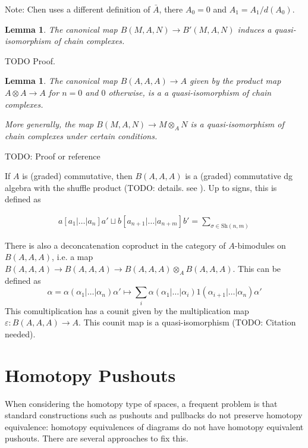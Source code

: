\documentclass{scrartcl}
\theoremstyle{plain}
\newtheorem{lemma}[theorem]{Lemma}
\theoremstyle{definition}
\newcommand{\shuffle}{\mathbin{\sqcup}}
\begin{document}
Note: Chen uses a different definition of $\bar A$, there $A_0 = 0$ and $A_1 = A_1 / d(A_0)$.

\begin{lemma}
    The canonical map $B(M, A, N)\to B'(M, A, N)$ induces a quasi-isomorphism of chain complexes.
\end{lemma}
TODO Proof.

\begin{lemma}\label{thm:bar_resolution}
    The canonical map $B(A, A, A)\to A$ given by the product map $A\otimes A\to A$ for $n=0$ and $0$ otherwise, is a a quasi-isomorphism of chain complexes.

    More generally, the map $B(M,A,N)\to M\otimes_A N$ is a quasi-isomorphism of chain complexes under certain conditions.
\end{lemma}
TODO: Proof or reference

If $A$ is (graded) commutative, then $B(A, A, A)$ is a (graded) commutative dg algebra with the shuffle product (TODO: details. see \cite[4.1]{chen1973iterated}). Up to signs, this is defined as

\begin{align*}
    a[a_1|\dots|a_n]a' \shuffle b[a_{n+1}|\dots|a_{n+m}]b' = \sum_{\sigma\in\mathrm{Sh}(n, m)}
\end{align*}

There is also a deconcatenation coproduct in the category of $A$-bimodules on $B(A, A, A)$, i.e. a map $B(A, A, A)\to B(A, A, A)\to B(A, A, A)\otimes_A B(A, A, A)$. This can be defined as 
$$\alpha = \alpha(\alpha_1|\dots|\alpha_n)\alpha' \mapsto \sum_i\alpha(\alpha_1|\dots|\alpha_i) 1 (\alpha_{i+1}|\dots|\alpha_n)\alpha'$$
This comultiplication has a counit given by the multiplication map $\varepsilon \colon B(A, A, A)\to A$. This counit map is a quasi-isomorphism (TODO: Citation needed).







\section{Homotopy Pushouts}

When considering the homotopy type of spaces, a frequent problem is that standard constructions such as pushouts and pullbacks do not preserve homotopy equivalence: homotopy equivalences of diagrams do not have homotopy equivalent pushouts. There are several approaches to fix this. 
\end{document}
